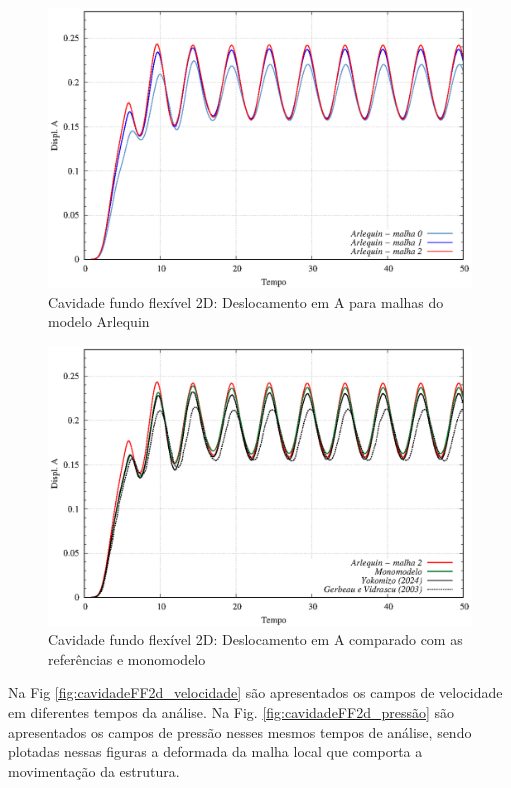 \documentclass[tese_patricia]{subfiles}
\begin{document}
\begin{figure}[htb!]
	\centering 
	\includegraphics[scale=1.0,trim=0cm 0cm 0cm 0cm, clip=true]{Imagens/Cap7/Cav2dDisplacementArlq.eps}	
	\caption{Cavidade fundo flexível 2D: Deslocamento em A para malhas do modelo Arlequin}
	\label{fig:cavidadeFF2d_DeslocamentoArlq}
\end{figure}

\begin{figure}[htb!]
	\centering 
	\includegraphics[scale=1.0,trim=0cm 0cm 0cm 0cm, clip=true]{Imagens/Cap7/Cav2dDisplacementArlqMono.eps}	
	\caption{Cavidade fundo flexível 2D: Deslocamento em A comparado com as referências e monomodelo}
	\label{fig:cavidadeFF2d_DeslocamentoA1}
\end{figure}

Na Fig \ref{fig:cavidadeFF2d_velocidade} são apresentados os campos de velocidade em diferentes tempos da análise. Na Fig. \ref{fig:cavidadeFF2d_pressão} são apresentados os campos de pressão nesses mesmos tempos de análise, sendo plotadas nessas figuras a deformada da malha local que comporta a movimentação da estrutura.
\end{document}
